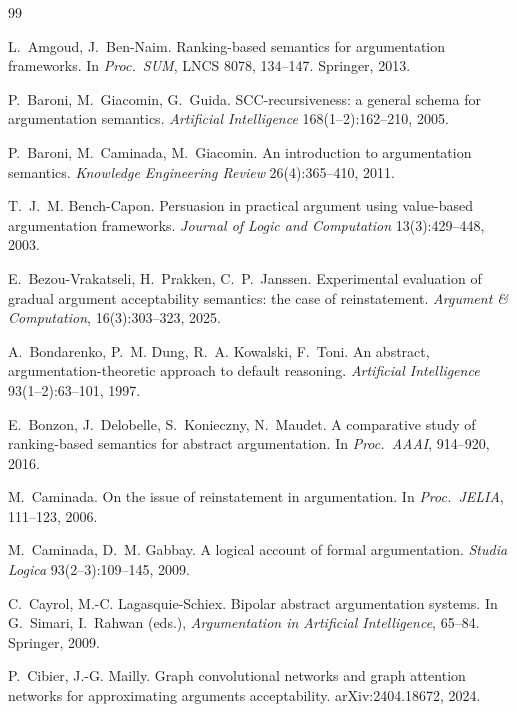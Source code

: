 \documentclass[review,12pt]{elsarticle}
\theoremstyle{definition}
\theoremstyle{remark}
\begin{document}
\begin{thebibliography}{99}

L.~Amgoud, J.~Ben-Naim.
Ranking-based semantics for argumentation frameworks.
In \emph{Proc.\ SUM}, LNCS 8078, 134--147. Springer, 2013.

P.~Baroni, M.~Giacomin, G.~Guida.
SCC-recursiveness: a general schema for argumentation semantics.
\emph{Artificial Intelligence} 168(1--2):162--210, 2005.

P.~Baroni, M.~Caminada, M.~Giacomin.
An introduction to argumentation semantics.
\emph{Knowledge Engineering Review} 26(4):365--410, 2011.

T.~J.~M. Bench-Capon.
Persuasion in practical argument using value-based argumentation frameworks.
\emph{Journal of Logic and Computation} 13(3):429--448, 2003.


E.~Bezou-Vrakatseli, H.~Prakken, C.~P.~Janssen.
Experimental evaluation of gradual argument acceptability semantics: the
case of reinstatement.
\emph{Argument \& Computation}, 16(3):303--323, 2025.

A.~Bondarenko, P.~M. Dung, R.~A. Kowalski, F.~Toni.
An abstract, argumentation-theoretic approach to default reasoning.
\emph{Artificial Intelligence} 93(1--2):63--101, 1997.

E.~Bonzon, J.~Delobelle, S.~Konieczny, N.~Maudet.
A comparative study of ranking-based semantics for abstract argumentation.
In \emph{Proc.\ AAAI}, 914--920, 2016.

M.~Caminada.
On the issue of reinstatement in argumentation.
In \emph{Proc.\ JELIA}, 111--123, 2006.

M.~Caminada, D.~M. Gabbay.
A logical account of formal argumentation.
\emph{Studia Logica} 93(2--3):109--145, 2009.

C.~Cayrol, M.-C. Lagasquie-Schiex.
Bipolar abstract argumentation systems.
In G.~Simari, I.~Rahwan (eds.), \emph{Argumentation in Artificial
Intelligence}, 65--84. Springer, 2009.

P.~Cibier, J.-G. Mailly.
Graph convolutional networks and graph attention networks for approximating
arguments acceptability.
arXiv:2404.18672, 2024.


\end{thebibliography}
\end{document}
